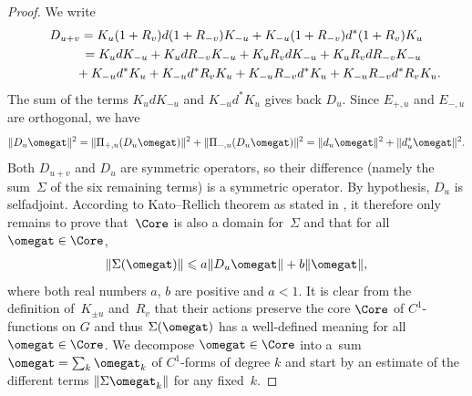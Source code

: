 \begin{proof}
We write
\begin{gather*}
D_{u+v} = K_{u} (1 + R_v) d (1+ R_{-v}) K_{-u} + K_{-u} (1+R_{-v}) d^* (1+R_v) K_{u} \\
\hphantom{D_{u+v}}{}
= K_u d K_{-u} + K_u d R_{-v} K_{-u} + K_u R_v d K_{-u} + K_u R_v d R_{-v} K_{-u} \\
\hphantom{D_{u+v}=}{}
+ K_{-u} d^* K_{u} + K_{-u} d^* R_v K_u + K_{-u} R_{-v} d^* K_u + K_{-u} R_{-v} d^* R_v K_u.
\end{gather*}
The sum of the terms $K_u d K_{-u}$ and $K_{-u} d^* K_{u}$ gives back $D_u$. Since $E_{+, u}$ and $E_{-,u}$ are orthogonal, we have
\begin{gather}
\label{Eqn:Pyth}
\| D_u \omegat \|^2 = \| \Pi_{+, u}( D_u \omegat ) \|^2 + \| \Pi_{-, u}( D_u \omegat ) \|^2 = \| d_{u} \omegat \|^2 + \| d_u^* \omegat \|^2.
\end{gather}
Both $D_{u+v}$ and $D_u$ are symmetric operators, so their dif\/ference (namely the sum~$\Sigma$ of the six remaining terms) is a symmetric operator. By hypothesis, $D_u$ is selfadjoint. According to Kato--Rellich theorem as stated in \cite[Theorem~X.12, p.~162]{ReedSimon2}, it therefore only remains to prove that~$\Core$ is also a domain for~$\Sigma$ and that for all $\omegat \in \Core$,
\begin{gather*}
\| \Sigma(\omegat) \| \leqslant a \| D_u \omegat \| + b \| \omegat \|,
\end{gather*}
where both real numbers $a$, $b$ are positive and $a < 1 $. It is clear from the def\/inition of~$K_{\pm u}$ and~$R_v$ that their actions preserve the core $\Core$ of $C^1$-functions on $G$ and thus $\Sigma(\omegat)$ has a well-def\/ined meaning for all $\omegat \in \Core$. We decompose $\omegat \in \Core$ into a~sum $\omegat = \sum_{k} \omegat_k$ of $C^1$-forms of degree $k$ and start by an estimate of the dif\/ferent terms $\| \Sigma \omegat_k \|$ for any f\/ixed~$k$.


\end{proof}
